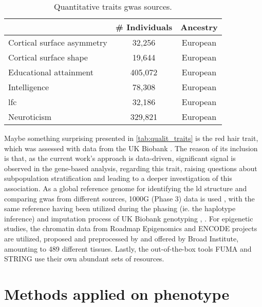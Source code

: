 \begin{table} [H]
	\centering
	\begin{tabular}{lcc}\toprule
		& \# Individuals & Ancestry\\\midrule
		Cortical surface asymmetry\cite{Sha2021} & 32,256 & European\\
		Cortical surface shape\cite{Naqvi2021} & 19,644 & European \\
		Educational attainment\cite{Okbay2016} &  405,072 & European \\
		Intelligence\cite{Sniekers2017} & 78,308 & European \\
		\acs{lfc}\cite{Mekki2022} & 32,186 & European \\
		Neuroticism\cite{Luciano2018} & 329,821 & European \\
		\bottomrule
	\end{tabular}
	\caption{Quantitative traits \ac{gwas} sources.}
	\label{tab:quantit_traits}
\end{table}
Maybe something surprising presented in \autoref{tab:qualit_traits} is the red hair trait, which was assessed with data from the UK Biobank \cite{Morgan2018}. The reason of its inclusion is that, as the current work's approach is data-driven, significant signal is observed in the gene-based analysis, regarding this trait, raising questions about subpopulation stratification and leading to a deeper investigation of this association. 
As a global reference genome for identifying the \ac{ld} structure and comparing \ac{gwas} from different sources, 1000G (Phase 3) data is used \cite{Auton2015}, with the same reference having been utilized during the phasing (ie. the haplotype inference) and imputation process of UK Biobank genotyping \cite{Bycroft2018}, . For epigenetic studies, the chromatin data from Roadmap Epigenomics \cite{RoadmapEpigenomicsConsortium2015} and ENCODE \cite{Dunham2012} projects are utilized, proposed and preprocessed by \citet{Finucane2018} and offered by Broad Institute, amounting to 489 different tissues. Lastly, the out-of-the-box tools FUMA \cite{Watanabe2017} and STRING\cite{Szklarczyk2021} use their own abundant sets of resources.




\section{Methods applied on phenotype}
\label{sec:methods_on_pheno}
